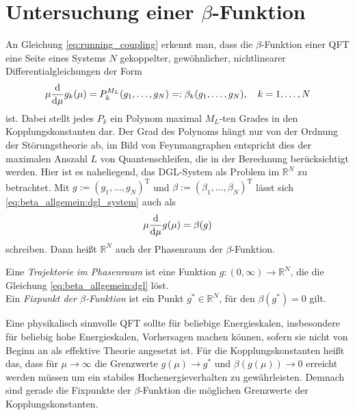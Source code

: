 \clearpage
\section{Untersuchung einer $\beta$-Funktion}


  An Gleichung \ref{eq:running_coupling} erkennt man, dass die $\beta$-Funktion 
  einer QFT eine Seite eines Systems $N$ gekoppelter, gewöhnlicher, 
  nichtlinearer Differentialgleichungen der Form 
  \begin{equation}
   \mu \frac{\text{d}}{\text{d} \mu} g_k (\mu)  = P_k^{M_L}(g_1,\ldots, g_N)=:\beta_k
   (g_1,\ldots,g_N) 
   , \quad k=1,\ldots,N \label{eq:beta_allgemein:dgl_system}
  \end{equation}
  ist. Dabei stellt jedes $P_k$ ein Polynom maximal $M_L$-ten Grades in den 
  Kopplungskonstanten dar. Der Grad des Polynoms hängt nur von der Ordnung der 
  Störungstheorie ab, im Bild von Feynmangraphen entspricht dies der maximalen 
  Anszahl $L$ von Quantenschleifen, die in der Berechnung berücksichtigt 
  werden. Hier ist es naheliegend, das DGL-System als Problem im $\mathbb{R}^N$ 
  zu betrachtet. Mit $g:=(g_1,\ldots,g_N)^\text{T}$ und 
  $\beta:=(\beta_1,\ldots,\beta_N)^\text{T}$ lässt sich 
  \eqref{eq:beta_allgemein:dgl_system} 
  auch als
  \begin{equation}
   \mu \frac{\text{d}}{\text{d} \mu} g(\mu)=\beta(g) \label{eq:beta_allgemein:dgl}
  \end{equation}
  schreiben. Dann heißt $\mathbb{R}^N$ auch der Phasenraum der $\beta$-Funktion.
  \begin{definition}
    Eine \textit{Trajektorie im Phasenraum} ist eine Funktion $g:(0,\infty)
    \rightarrow \mathbb{R}^N$, die die Gleichung \eqref{eq:beta_allgemein:dgl} 
    löst.\\Ein \textit{Fixpunkt der $\beta$-Funktion} ist ein Punkt 
    $g^*\in \mathbb{R}^N$, für den
    $\beta(g^*)=0$ gilt.
  \end{definition}
  
  Eine physikalisch sinnvolle QFT sollte für beliebige Energieskalen, 
  insbesondere für beliebig hohe Energieskalen,
  Vorhersagen machen können, sofern sie nicht von Beginn an als effektive 
  Theorie angesetzt ist. Für die Kopplungskonstanten heißt das, dass für 
  $\mu \to \infty$ die Grenzwerte $g(\mu) \to g^*$ und 
  $\beta(g(\mu)) \to 0$ erreicht werden müssen um ein stabiles 
  Hochenergieverhalten zu gewährleisten. Demnach sind gerade die Fixpunkte der 
  $\beta$-Funktion die möglichen Grenzwerte der Kopplungskonstanten.
  
